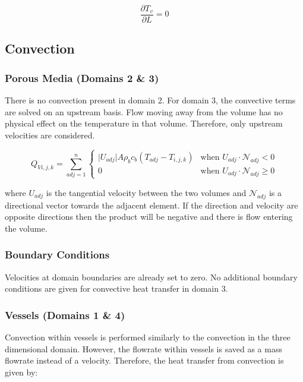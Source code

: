 \documentclass[11pt,english,a4paper,twoside,openright]{report}
\begin{document}
{{{{{{{{\begin{equation}
\frac{\partial T_{v}}{\partial L} = 0
\end{equation}

\subsection{Convection}

\subsubsection{Porous Media (Domains 2 \& 3)}

There is no convection present in domain 2. For domain 3, the convective terms are solved on an upstream basis. Flow moving away from the volume has no physical effect on the temperature in that volume. Therefore, only upstream velocities are considered.

\begin{equation}
Q_{Vi,j,k}=\sum_{adj=1}^{n}
\begin{cases}
\lvert U_{adj}\rvert A\rho_{b}c_{b}(T_{adj}-T_{i,j,k}) & \text{when $U_{adj}\cdot \mathcal{N}_{adj} < 0$} \\
0 & \text{when $U_{adj}\cdot \mathcal{N}_{adj} \geq 0$}
\end{cases}
\label{Eq:3DConvection}
\end{equation}

where $U_{adj}$ is the tangential velocity between the two volumes and $\mathcal{N}_{adj}$ is a directional vector towards the adjacent element. If the direction and velocity are opposite directions then the product will be negative and there is flow entering the volume. 

\subsubsection{Boundary Conditions}

Velocities at domain boundaries are already set to zero. No additional boundary conditions are given for convective heat transfer in domain 3.

\subsubsection{Vessels (Domains 1 \& 4)}

Convection within vessels is performed similarly to the convection in the three dimensional domain. However, the flowrate within vessels is saved as a mass flowrate instead of a velocity. Therefore, the heat transfer from convection is given by:

}}}}}}}}
\end{document}
